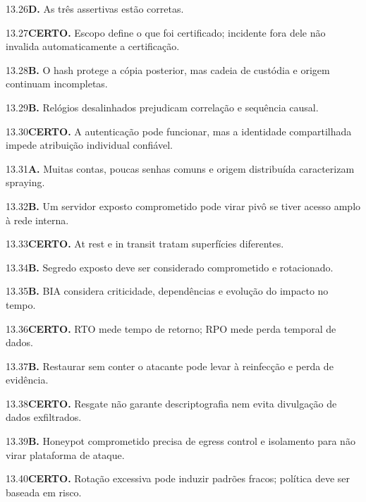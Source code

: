 \begin{solucao}{13.26}\textbf{D.} As três assertivas estão corretas.\end{solucao}
\begin{solucao}{13.27}\textbf{CERTO.} Escopo define o que foi certificado; incidente fora dele não invalida automaticamente a certificação.\end{solucao}
\begin{solucao}{13.28}\textbf{B.} O hash protege a cópia posterior, mas cadeia de custódia e origem continuam incompletas.\end{solucao}
\begin{solucao}{13.29}\textbf{B.} Relógios desalinhados prejudicam correlação e sequência causal.\end{solucao}
\begin{solucao}{13.30}\textbf{CERTO.} A autenticação pode funcionar, mas a identidade compartilhada impede atribuição individual confiável.\end{solucao}
\begin{solucao}{13.31}\textbf{A.} Muitas contas, poucas senhas comuns e origem distribuída caracterizam spraying.\end{solucao}
\begin{solucao}{13.32}\textbf{B.} Um servidor exposto comprometido pode virar pivô se tiver acesso amplo à rede interna.\end{solucao}
\begin{solucao}{13.33}\textbf{CERTO.} At rest e in transit tratam superfícies diferentes.\end{solucao}
\begin{solucao}{13.34}\textbf{B.} Segredo exposto deve ser considerado comprometido e rotacionado.\end{solucao}
\begin{solucao}{13.35}\textbf{B.} BIA considera criticidade, dependências e evolução do impacto no tempo.\end{solucao}
\begin{solucao}{13.36}\textbf{CERTO.} RTO mede tempo de retorno; RPO mede perda temporal de dados.\end{solucao}
\begin{solucao}{13.37}\textbf{B.} Restaurar sem conter o atacante pode levar à reinfecção e perda de evidência.\end{solucao}
\begin{solucao}{13.38}\textbf{CERTO.} Resgate não garante descriptografia nem evita divulgação de dados exfiltrados.\end{solucao}
\begin{solucao}{13.39}\textbf{B.} Honeypot comprometido precisa de egress control e isolamento para não virar plataforma de ataque.\end{solucao}
\begin{solucao}{13.40}\textbf{CERTO.} Rotação excessiva pode induzir padrões fracos; política deve ser baseada em risco.\end{solucao}

